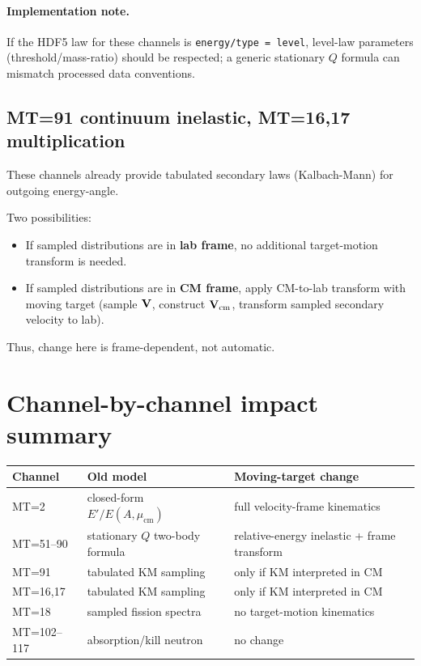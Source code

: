 \documentclass[11pt]{article}
\begin{document}
\paragraph{Implementation note.}
If the HDF5 law for these channels is \texttt{energy/type = level}, level-law parameters (threshold/mass-ratio) should be respected; a generic stationary $Q$ formula can mismatch processed data conventions.

\subsection{MT=91 continuum inelastic, MT=16,17 multiplication}
These channels already provide tabulated secondary laws (Kalbach-Mann) for outgoing energy-angle.

Two possibilities:
\begin{itemize}
  \item If sampled distributions are in \textbf{lab frame}, no additional target-motion transform is needed.
  \item If sampled distributions are in \textbf{CM frame}, apply CM-to-lab transform with moving target (sample $\vb{V}$, construct $\vb{V}_{\text{cm}}$, transform sampled secondary velocity to lab).
\end{itemize}

Thus, change here is frame-dependent, not automatic.

\section{Channel-by-channel impact summary}
\begin{center}
\begin{tabular}{@{}lll@{}}
\toprule
Channel & Old model & Moving-target change \\
\midrule
MT=2 & closed-form $E'/E(A,\mu_{\text{cm}})$ & full velocity-frame kinematics \\
MT=51--90 & stationary $Q$ two-body formula & relative-energy inelastic + frame transform \\
MT=91 & tabulated KM sampling & only if KM interpreted in CM \\
MT=16,17 & tabulated KM sampling & only if KM interpreted in CM \\
MT=18 & sampled fission spectra & no target-motion kinematics \\
MT=102--117 & absorption/kill neutron & no change \\
\bottomrule
\end{tabular}
\end{center}
\end{document}
